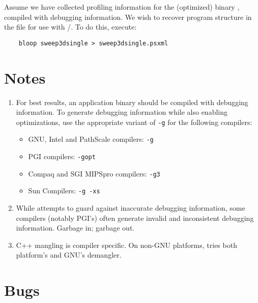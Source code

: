 \documentclass[english]{article}
\begin{document}
Assume we have collected profiling information for the (optimized) binary , compiled with debugging information.
We wish to recover program structure in the file  for use with /.
To do this, execute:
\begin{verbatim}
    bloop sweep3dsingle > sweep3dsingle.psxml
\end{verbatim}


\section{Notes}

\begin{enumerate}

\item For best results, an application binary should be compiled with debugging information.
To generate debugging information while also enabling optimizations, use the appropriate variant of \verb+-g+ for the following compilers:
\begin{itemize}
\item GNU, Intel and PathScale compilers: \verb+-g+
\item PGI compilers: \verb+-gopt+
\item Compaq and SGI MIPSpro compilers: \verb+-g3+
\item Sun Compilers: \verb+-g -xs+
\end{itemize}

\item While  attempts to guard against inaccurate debugging information, some compilers (notably PGI's) often generate invalid and inconsistent debugging information.
Garbage in; garbage out.

\item C++ mangling is compiler specific. On non-GNU platforms, 
tries both platform's and GNU's demangler.

\end{enumerate}

\section{Bugs}
\end{document}

